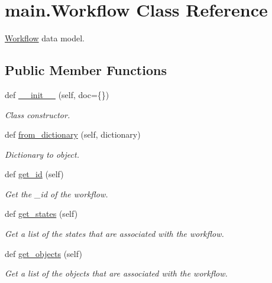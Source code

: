 \hypertarget{classmain_1_1_workflow}{}\section{main.\+Workflow Class Reference}
\label{classmain_1_1_workflow}


\hyperlink{classmain_1_1_workflow}{Workflow} data model.  


\subsection*{Public Member Functions}
\begin{DoxyCompactItemize}
\item 
def \hyperlink{classmain_1_1_workflow_aa2446ab34eba706ccbc2cf8ce5872037}{\+\_\+\+\_\+init\+\_\+\+\_\+} (self, doc=\{\})
\begin{DoxyCompactList}\small\item\em Class constructor. \end{DoxyCompactList}\item 
def \hyperlink{classmain_1_1_workflow_ad562342bfd6b6228720c72c2931b0d0b}{from\+\_\+dictionary} (self, dictionary)
\begin{DoxyCompactList}\small\item\em Dictionary to object. \end{DoxyCompactList}\item 
def \hyperlink{classmain_1_1_workflow_a574976ff4609ac78ef72af7a08f87681}{get\+\_\+id} (self)
\begin{DoxyCompactList}\small\item\em Get the \+\_\+id of the workflow. \end{DoxyCompactList}\item 
def \hyperlink{classmain_1_1_workflow_ab8e42b542cf0e06ad527513bc77cfe67}{get\+\_\+states} (self)
\begin{DoxyCompactList}\small\item\em Get a list of the states that are associated with the workflow. \end{DoxyCompactList}\item 
def \hyperlink{classmain_1_1_workflow_abd401c42224d373366f33f785c4f19a2}{get\+\_\+objects} (self)
\begin{DoxyCompactList}\small\item\em Get a list of the objects that are associated with the workflow. \end{DoxyCompactList}\item 

\end{DoxyCompactItemize}
